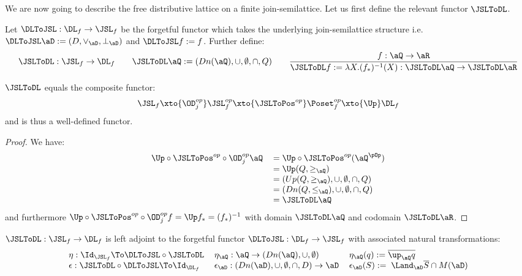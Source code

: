 \documentclass{article}
\begin{document}
We are now going to describe the free distributive lattice on a finite join-semilattice. Let us first define the relevant functor $\JSLToDL$.

\begin{definition}
Let $\DLToJSL : \DL_f \to \JSL_f$ be the forgetful functor which takes the underlying join-semilattice structure i.e.\ $\DLToJSL \aD := (D,\lor_\aD,\bot_\aD)$ and $\DLToJSL f := f$. Further define:
\[
\JSLToDL : \JSL_f \to \DL_f
\qquad
\JSLToDL \aQ := (Dn(\aQ),\cup,\emptyset,\cap,Q)
\qquad
\dfrac{f : \aQ \to \aR}{\JSLToDL f := \lambda X. (f_*)^{-1}(X) : \JSLToDL\aQ \to \JSLToDL\aR }
\]
\end{definition}

\begin{lemma}
$\JSLToDL$ equals the composite functor:
\[
\JSL_f \xto{\OD_j^{op}} \JSL_f^{op} \xto{\JSLToPos^{op}} \Poset_f^{op} \xto{\Up} \DL_f
\]
and is thus a well-defined functor.
\end{lemma}

\begin{proof}
We have:
\[
\begin{tabular}{lll}
$\Up \circ \JSLToPos^{op} \circ \OD_j^{op} \aQ$
&
$= \Up \circ \JSLToPos^{op}(\aQ^{\pOp})$
\\&
$= \Up (Q,\geq_\aQ)$
\\&
$= (Up(Q,\geq_\aQ),\cup,\emptyset,\cap,Q)$
\\&
$= (Dn(Q,\leq_\aQ),\cup,\emptyset,\cap,Q)$
\\&
$= \JSLToDL \aQ$
\end{tabular}
\]
and furthermore $\Up \circ \JSLToPos^{op} \circ \OD_j^{op} f = \Up f_* = (f_*)^{-1}$ with domain $\JSLToDL \aQ$ and codomain $\JSLToDL \aR$.
\end{proof}



\begin{theorem}
\label{thm_free_dl_on_jsl}
\item
$\JSLToDL : \JSL_f \to \DL_f$ is left adjoint to the forgetful functor $\DLToJSL : \DL_f \to \JSL_f$ with associated natural transformations:
\[
\begin{tabular}{lll}
$\eta : \Id_{\JSL_f} \To \DLToJSL \circ \JSLToDL$
&
$\eta_\aQ : \aQ \to (Dn(\aQ),\cup,\emptyset)$
&
$\eta_\aQ(q) := \overline{\up_\aQ q}$
\\
$\epsilon : \JSLToDL \circ \DLToJSL \To \Id_{\DL_f}$
&
$\epsilon_\aD : (Dn(\aD),\cup,\emptyset,\cap,D) \to \aD$
&
$\epsilon_\aD(S) := \; \Land_\aD \overline{S} \cap M(\aD)$
\end{tabular}
\]
\end{theorem}
\end{document}
